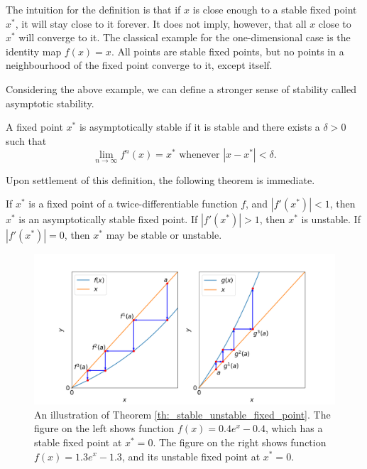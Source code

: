 The intuition for the definition is that if $x$ is close enough to a stable fixed point $x^*$, it will stay close to it forever. 
It does not imply, however, that all $x$ close to $x^*$ will converge to it.
The classical example for the one-dimensional case is the identity map $f(x) = x$. 
All points are stable fixed points, but no points in a neighbourhood of the fixed point converge to it, except itself.

Considering the above example, we can define a stronger sense of stability called asymptotic stability.

\begin{defn}
	A fixed point $x^*$ is asymptotically stable if it is stable and there exists a $\delta>0$ such that 
	$$
		\lim_{n \rightarrow \infty} f^n(x) = x^* \text{ whenever } |x - x^*| < \delta.
	$$
\end{defn}

Upon settlement of this definition, the following theorem is immediate.

\begin{thm}\label{th:_stable_unstable_fixed_point}
	If $x^*$ is a fixed point of a twice-differentiable function $f$, and $|f'(x^*)| < 1$, then $x^*$ is an asymptotically stable fixed point.
	If $|f'(x^*)| > 1$, then $x^*$ is unstable.
	If $|f'(x^*)| = 0$, then $x^*$ may be stable or unstable.
\end{thm}

\begin{figure}
	\centering
	\includegraphics[width=\textwidth]{./figures/stable_and_unstable_fixed_point.png}
	\caption{An illustration of Theorem \ref{th:_stable_unstable_fixed_point}.
	The figure on the left shows function $f(x) = 0.4 e^x - 0.4$, which has a stable fixed point at $x^* = 0$. 
	The figure on the right shows function $f(x) = 1.3 e^x - 1.3$, and its unstable fixed point at $x^* = 0$.}
	\label{fig:stable and unstable fixed point}
\end{figure}


